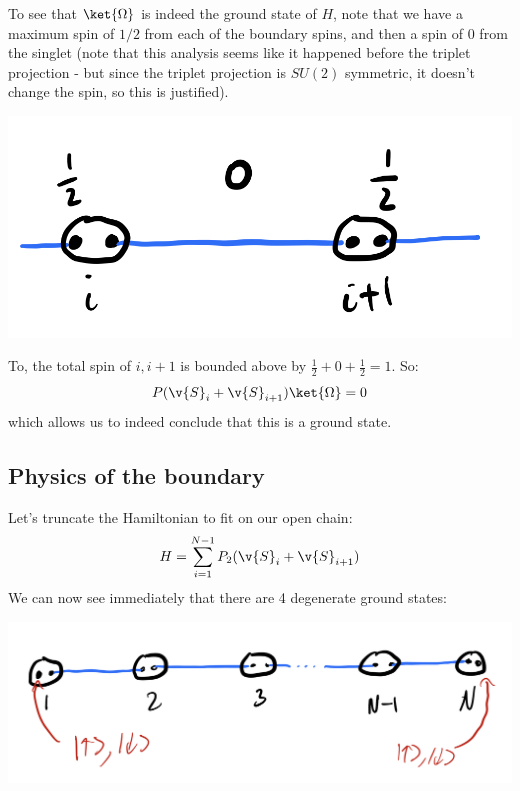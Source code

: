 To see that $\ket{\Omega}$ is indeed the ground state of $H$, note that we have a maximum spin of $1/2$ from each of the boundary spins, and then a spin of 0 from the singlet (note that this analysis seems like it happened before the triplet projection - but since the triplet projection is $SU(2)$ symmetric, it doesn't change the spin, so this is justified).

\begin{center}
    \includegraphics[scale=0.35]{Lectures/Images/lec15-AKLTspin.png}
\end{center}

To, the total spin of $i, i+1$ is bounded above by $\frac{1}{2} + 0 + \frac{1}{2} = 1$. So:
\begin{equation}
    P(\v{S}_i + \v{S}_{i+1})\ket{\Omega} = 0
\end{equation}
which allows us to indeed conclude that this is a ground state.

\subsection{Physics of the boundary}
Let's truncate the Hamiltonian to fit on our open chain:
\begin{equation}
    H = \sum_{i=1}^{N-1}P_2(\v{S}_i + \v{S}_{i+1})
\end{equation}
We can now see immediately that there are 4 degenerate ground states:

\begin{center}
    \includegraphics[scale=0.35]{Lectures/Images/lec15-AKLTboundary.png}
\end{center}

